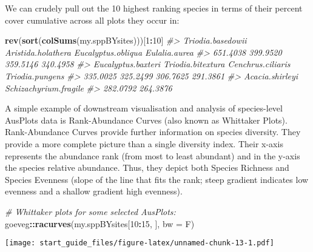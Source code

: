 \documentclass[
]{article}
\newenvironment{Shaded}{\begin{snugshade}}{\end{snugshade}}
\newcommand{\CommentTok}[1]{\textcolor[rgb]{0.56,0.35,0.01}{\textit{#1}}}
\newcommand{\DataTypeTok}[1]{\textcolor[rgb]{0.13,0.29,0.53}{#1}}
\newcommand{\DecValTok}[1]{\textcolor[rgb]{0.00,0.00,0.81}{#1}}
\newcommand{\KeywordTok}[1]{\textcolor[rgb]{0.13,0.29,0.53}{\textbf{#1}}}
\newcommand{\NormalTok}[1]{#1}
\newcommand{\OperatorTok}[1]{\textcolor[rgb]{0.81,0.36,0.00}{\textbf{#1}}}
\begin{document}
We can crudely pull out the 10 highest ranking species in terms of their
percent cover cumulative across all plots they occur in:

\begin{Shaded}
\begin{Highlighting}[]
\KeywordTok{rev}\NormalTok{(}\KeywordTok{sort}\NormalTok{(}\KeywordTok{colSums}\NormalTok{(my.sppBYsites)))[}\DecValTok{1}\OperatorTok{:}\DecValTok{10}\NormalTok{]}
\CommentTok{#>     Triodia.basedowii    Aristida.holathera    Eucalyptus.obliqua         Eulalia.aurea }
\CommentTok{#>              651.4038              399.9520              359.5146              340.4958 }
\CommentTok{#>    Eucalyptus.baxteri     Triodia.bitextura     Cenchrus.ciliaris       Triodia.pungens }
\CommentTok{#>              335.0025              325.2499              306.7625              291.3861 }
\CommentTok{#>       Acacia.shirleyi Schizachyrium.fragile }
\CommentTok{#>              282.0792              264.3876}
\end{Highlighting}
\end{Shaded}

A simple example of downstream visualisation and analysis of
species-level AusPlots data is Rank-Abundance Curves (also known as
Whittaker Plots). Rank-Abundance Curves provide further information on
species diversity. They provide a more complete picture than a single
diversity index. Their x-axis represents the abundance rank (from most
to least abundant) and in the y-axis the species relative abundance.
Thus, they depict both Species Richness and Species Evenness (slope of
the line that fits the rank; steep gradient indicates low evenness and a
shallow gradient high evenness).

\begin{Shaded}
\begin{Highlighting}[]
\CommentTok{# Whittaker plots for some selected AusPlots:}
\NormalTok{goeveg}\OperatorTok{::}\KeywordTok{racurves}\NormalTok{(my.sppBYsites[}\DecValTok{10}\OperatorTok{:}\DecValTok{15}\NormalTok{, ], }\DataTypeTok{bw =}\NormalTok{ F)}
\end{Highlighting}
\end{Shaded}

\texttt{[image: start\_guide\_files/figure-latex/unnamed-chunk-13-1.pdf]}
\end{document}
